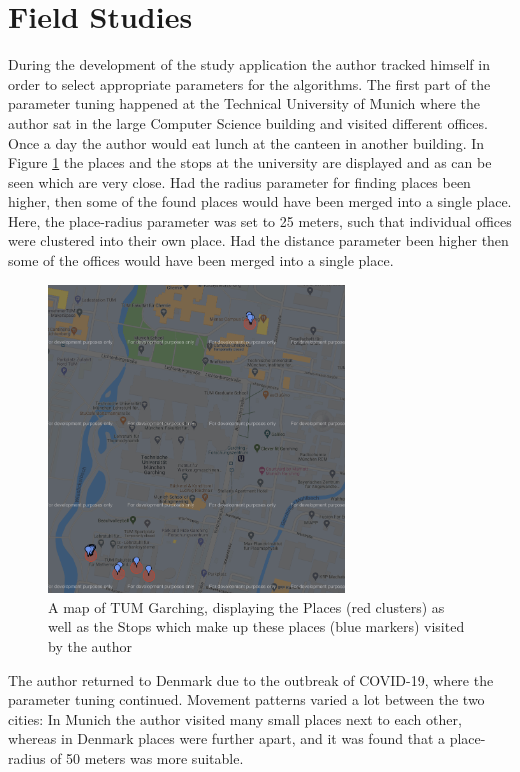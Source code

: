 \section{Field Studies}
During the development of the study application the author tracked himself in order to select appropriate parameters for the algorithms. The first part of the parameter tuning happened at the Technical University of Munich where the author sat in the large Computer Science building and visited different offices. Once a day the author would eat lunch at the canteen in another building. In Figure \ref{fig:tum-map} the places and the stops at the university are displayed and as can be seen which are very close. Had the radius parameter for finding places been higher, then some of the found places would have been merged into a single place. Here, the place-radius parameter was set to 25 meters, such that individual offices were clustered into their own place. Had the distance parameter been higher then some of the offices would have been merged into a single place.\\

\begin{figure}
    \centering
    \includegraphics[width=0.7\textwidth]{images/map/map-tum.png}
    \caption{A map of TUM Garching, displaying the Places (red clusters) as well as the Stops which make up these places (blue markers) visited by the author}
    \label{fig:tum-map}
\end{figure}

The author returned to Denmark due to the outbreak of COVID-19, where the parameter tuning continued. Movement patterns varied a lot between the two cities: In Munich the author visited many small places next to each other, whereas in Denmark places were further  apart, and it was found that a place-radius of 50 meters was more suitable.\\

